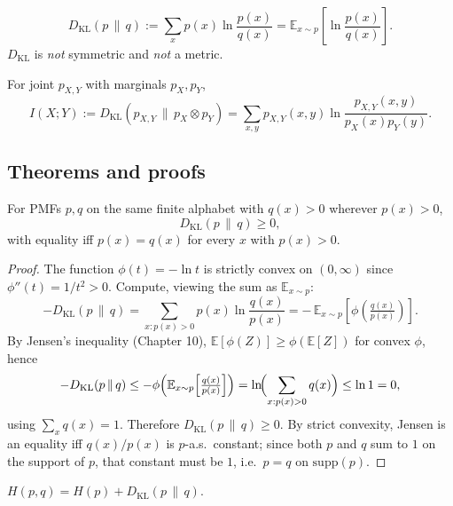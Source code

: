 \begin{definition}
\[
D_{\mathrm{KL}}(p \,\|\, q) := \sum_{x} p(x) \ln \frac{p(x)}{q(x)} = \mathbb{E}_{x \sim p}\!\left[\ln \frac{p(x)}{q(x)}\right].
\]
$D_{\mathrm{KL}}$ is \emph{not} symmetric and \emph{not} a metric.
\end{definition}

\begin{definition}
For joint $p_{X,Y}$ with marginals $p_X, p_Y$,
\[
I(X; Y) := D_{\mathrm{KL}}(p_{X,Y} \,\|\, p_X \otimes p_Y) = \sum_{x,y} p_{X,Y}(x,y) \ln \frac{p_{X,Y}(x,y)}{p_X(x) p_Y(y)}.
\]
\end{definition}

\subsection*{Theorems and proofs}

\begin{theorem}
For PMFs $p, q$ on the same finite alphabet with $q(x) > 0$ wherever $p(x) > 0$,
\[
D_{\mathrm{KL}}(p \,\|\, q) \geq 0,
\]
with equality iff $p(x) = q(x)$ for every $x$ with $p(x) > 0$.
\end{theorem}

\begin{proof}
The function $\phi(t) = -\ln t$ is strictly convex on $(0, \infty)$ since $\phi''(t) = 1/t^2 > 0$. Compute, viewing the sum as $\mathbb{E}_{x \sim p}$:
\[
-D_{\mathrm{KL}}(p \,\|\, q) = \sum_{x : p(x) > 0} p(x) \ln \frac{q(x)}{p(x)} = -\,\mathbb{E}_{x \sim p}\!\left[\phi\!\left(\tfrac{q(x)}{p(x)}\right)\right].
\]
By Jensen's inequality (Chapter 10), $\mathbb{E}[\phi(Z)] \geq \phi(\mathbb{E}[Z])$ for convex $\phi$, hence
\[
-D_{\mathrm{KL}}(p \,\|\, q) \leq -\phi\!\left(\mathbb{E}_{x \sim p}\!\left[\tfrac{q(x)}{p(x)}\right]\right) = \ln\!\Bigl(\sum_{x : p(x) > 0} q(x)\Bigr) \leq \ln 1 = 0,
\]
using $\sum_x q(x) = 1$. Therefore $D_{\mathrm{KL}}(p \,\|\, q) \geq 0$. By strict convexity, Jensen is an equality iff $q(x)/p(x)$ is $p$-a.s.\ constant; since both $p$ and $q$ sum to $1$ on the support of $p$, that constant must be $1$, i.e.\ $p = q$ on $\mathrm{supp}(p)$.
\end{proof}

\begin{theorem}
$H(p, q) = H(p) + D_{\mathrm{KL}}(p \,\|\, q).$
\end{theorem}

